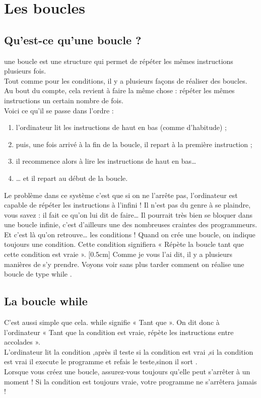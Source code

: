 \section{Les boucles}




\subsection{Qu'est-ce qu'une boucle ?}
une boucle est une structure qui permet de répéter les mêmes instructions plusieurs fois.
\\[0.5cm]
Tout comme pour les conditions, il y a plusieurs façons de réaliser des boucles. Au bout du compte, cela revient à faire la même chose : répéter les mêmes instructions un certain nombre de fois.
\\[0.5cm]
Voici ce qu'il se passe dans l'ordre :

\begin{enumerate}
\item l'ordinateur lit les instructions de haut en bas (comme d'habitude) ;
\item puis, une fois arrivé à la fin de la boucle, il repart à la première instruction ;
\item il recommence alors à lire les instructions de haut en bas…
\item … et il repart au début de la boucle.
\end{enumerate}
Le problème dans ce système c'est que si on ne l'arrête pas, l'ordinateur est capable de répéter les instructions à l'infini ! Il n'est pas du genre à se plaindre, vous savez : il fait ce qu'on lui dit de faire… Il pourrait très bien se bloquer dans une boucle infinie, c'est d'ailleurs une des nombreuses craintes des programmeurs.
\\[0.5cm]
Et c'est là qu'on retrouve… les conditions ! Quand on crée une boucle, on indique toujours une condition. Cette condition signifiera « Répète la boucle tant que cette condition est vraie ».
[0.5cm]
Comme je vous l'ai dit, il y a plusieurs manières de s'y prendre. Voyons voir sans plus tarder comment on réalise une boucle de type while .


\subsection{La boucle while}
C'est aussi simple que cela. while signifie « Tant que ». On dit donc à l'ordinateur « Tant que la condition est vraie, répète les instructions entre accolades ».
\\[0.5cm]
L'ordinateur lit la condition ,après il teste si la condition est vrai ,si la condition est vrai il execute le programme et refais le teste,sinon il sort .
\\[0.5cm]
Lorsque vous créez une boucle, assurez-vous toujours qu'elle peut s'arrêter à un moment ! Si la condition est toujours vraie, votre programme ne s'arrêtera jamais !
